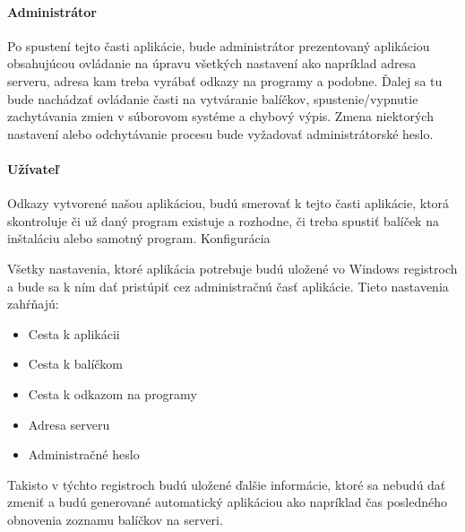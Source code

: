 \paragraph{Administrátor}
Po spustení tejto časti aplikácie, bude administrátor prezentovaný aplikáciou obsahujúcou ovládanie na úpravu všetkých nastavení ako napríklad adresa serveru, adresa kam treba vyrábať odkazy na programy a podobne. Ďalej sa tu bude nachádzať ovládanie časti na vytváranie balíčkov, spustenie/vypnutie zachytávania zmien v súborovom systéme a chybový výpis. Zmena niektorých nastavení alebo odchytávanie procesu bude vyžadovať administrátorské heslo.
\paragraph{Užívateľ}
Odkazy vytvorené našou aplikáciou, budú smerovať k tejto časti aplikácie, ktorá skontroluje či už daný program existuje a rozhodne, či treba spustiť balíček na inštaláciu alebo samotný program.
Konfigurácia

Všetky nastavenia, ktoré aplikácia potrebuje budú uložené vo Windows registroch a bude sa k ním dať pristúpiť cez administračnú časť aplikácie. Tieto nastavenia zahŕňajú:

\begin{itemize}
\item Cesta k aplikácii
\item Cesta k balíčkom
\item Cesta k odkazom na programy
\item Adresa serveru
\item Administračné heslo
\end{itemize}

Takisto v týchto registroch budú uložené ďalšie informácie, ktoré sa nebudú dať zmeniť a budú generované automatický aplikáciou ako napríklad čas posledného obnovenia zoznamu balíčkov na serveri.

